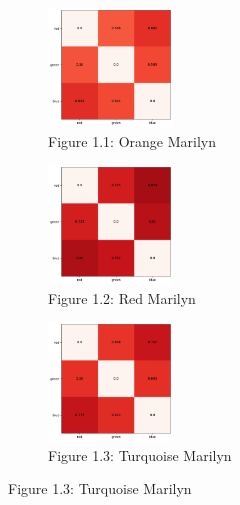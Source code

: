 \documentclass{article}
\begin{document}
\begin{figure}[ht]
  \centering
  \begin{subfigure}{0.3\textwidth}
    \centering
    \includegraphics[width=125px]{main_files/figure-latex/3_1_orange_marilyn_entropy.pdf}
    \caption{Figure 1.1: Orange Marilyn}
    \label{fig:1_1_orange_marilyn}
  \end{subfigure}
  \hfill
  \begin{subfigure}{0.3\textwidth}
    \centering
    \includegraphics[width=125px]{main_files/figure-latex/3_2_red_marilyn_entropy.pdf}
    \caption{Figure 1.2: Red Marilyn}
    \label{fig:1_2_red_marilyn}
  \end{subfigure}
  \hfill
  \begin{subfigure}{0.3\textwidth}
    \centering
    \includegraphics[width=125px]{main_files/figure-latex/3_3_turq_marilyn_entropy.pdf}
    \caption{Figure 1.3: Turquoise Marilyn}
    \label{fig:1_3_turq_marilyn}
  \end{subfigure}

  \vspace{1em} %


\end{figure}
\end{document}
